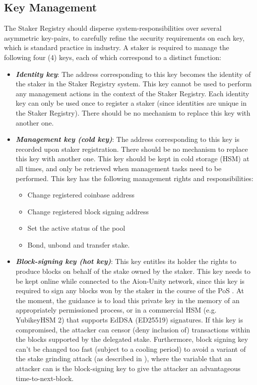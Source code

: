 \subsection{Key Management} \label{key_management_staker_registry}
The Staker Registry should disperse system-responsibilities over several asymmetric key-pairs, to carefully refine the security requirements on each key, which is standard practice in industry. A staker is required to manage the following four (4) keys, each of which correspond to a distinct function: 
\begin{itemize}
    \item \textbf{\textit{Identity key}}: The address corresponding to this key becomes the identity of the staker in the Staker Registry system. This key cannot be used to perform any management actions in the context of the Staker Registry. Each identity key can only be used once to register a staker (since identities are unique in the Staker Registry). There should be no mechanism to replace this key with another one.
    
    \item \textbf{\textit{Management key (cold key)}}: The address corresponding to this key is recorded upon staker registration. There should be no mechanism to replace this key with another one. This key should be kept in cold storage (HSM) at all times, and only be retrieved when management tasks need to be performed. This key has the following management rights and responsibilities:
    \begin{itemize} [label=--,nosep]
        \item Change registered coinbase address
        \item Change registered block signing address
        \item Set the active status of the pool
        \item Bond, unbond and transfer stake. 
    \end{itemize}
    
    \item \textbf{\textit{Block-signing key (hot key)}}: This key entitles its holder the rights to produce blocks on behalf of the stake owned by the staker. This key needs to be kept online while connected to the Aion-Unity network, since this key is required to sign any blocks won by the staker in the course of the PoS . At the moment, the guidance is to load this private key in the memory of an appropriately permissioned process, or in a commercial HSM (e.g. YubikeyHSM 2) that supports EdDSA (ED25519) signatures. If this key is compromised, the attacker can censor (deny inclusion of) transactions within the blocks supported by the delegated stake. Furthermore, block signing key can't be changed too fast (subject to a cooling period) to avoid a variant of the stake grinding attack (as described in \cite{WZS19}), where the variable that an attacker can  is the block-signing key to give the attacker an advantageous time-to-next-block. 
    

\end{itemize}
